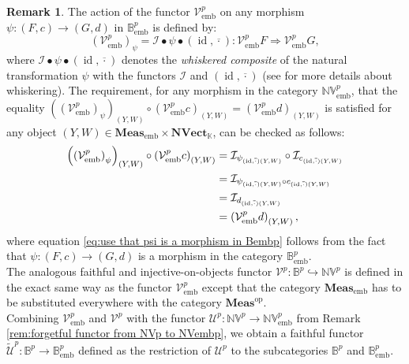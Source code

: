 \documentclass{amsart}
\theoremstyle{definition}
\newtheorem{remark}[definition]{Remark}
\theoremstyle{plain}
\newcommand{\id}{\operatorname{id}}
\newcommand{\opMeas}{\mathbf{Meas}^\mathrm{op}}
\newcommand{\embMeas}{\mathbf{Meas}_\mathrm{emb}}
\newcommand{\NVect}{\mathbf{NVect}_{\mathbb{K}}}
\newcommand{\NVembp}{\mathbb{NV}_{\mathrm{emb}}^p}
\newcommand{\NVp}{\mathbb{NV}^p}
\newcommand{\Bembp}{\mathbb{B}_{\mathrm{emb}}^p}
\newcommand{\Bp}{\mathbb{B}^p}
\begin{document}
\begin{remark}
            The action of the functor $\mathcal{V}_{\mathrm{emb}}^p$ on any morphism $\psi \colon (F,c) \rightarrow (G,d)$ in $\Bembp$ is defined by: 
            \begin{equation*}
                \left( \mathcal{V}_{\mathrm{emb}}^p \right)_{\psi} = \mathcal{I} \bullet \psi \bullet (\id,\overline{\cdot}) \colon \mathcal{V}_{\mathrm{emb}}^pF \Rightarrow \mathcal{V}_{\mathrm{emb}}^pG,
            \end{equation*}
            where $\mathcal{I} \bullet \psi \bullet (\id,\overline{\cdot})$ denotes the \emph{whiskered composite} of the natural transformation $\psi$ with the functors $\mathcal{I}$ and $(\id,\overline{\cdot})$ (see \cite[\S 1.7]{Riehl2016} for more details about whiskering).
            The requirement, for any morphism in the category $\NVembp$, that the equality $\left( \left( \mathcal{V}_{\mathrm{emb}}^p \right)_{\psi} \right)_{(Y,W)} \circ \left( \mathcal{V}_{\mathrm{emb}}^pc \right)_{(Y,W)} = \left( \mathcal{V}_{\mathrm{emb}}^pd \right)_{(Y,W)}$ is satisfied for any object $(Y,W) \in \embMeas \times \NVect$, can be checked as follows:
            \begin{align}
                \left( \left( \mathcal{V}_{\mathrm{emb}}^p \right)_{\psi} \right)_{(Y,W)} \circ \left( \mathcal{V}_{\mathrm{emb}}^pc \right)_{(Y,W)} &= \mathcal{I}_{\psi_{(\id,\overline{\cdot})(Y,W)}} \circ \mathcal{I}_{c_{(\id,\overline{\cdot})(Y,W)}} \notag \\
                &= \mathcal{I}_{\psi_{(\id,\overline{\cdot})(Y,W)} \circ c_{(\id,\overline{\cdot})(Y,W)}} \notag \\
                &= \mathcal{I}_{d_{(\id,\overline{\cdot})(Y,W)}} \label{eq:use that psi is a morphism in Bembp} \\
                &= \left( \mathcal{V}_{\mathrm{emb}}^pd \right)_{(Y,W)}, \notag
            \end{align}
            where equation \eqref{eq:use that psi is a morphism in Bembp} follows from the fact that $\psi \colon (F,c) \rightarrow (G,d)$ is a morphism in the category $\Bembp$. \\ 
            The analogous faithful and injective-on-objects functor $\mathcal{V}^p \colon \Bp \hookrightarrow \NVp$ is defined in the exact same way as the functor $\mathcal{V}_{\mathrm{emb}}^p$ except that the category $\embMeas$ has to be substituted everywhere with the category $\opMeas$. \\ 
            Combining $\mathcal{V}_{\mathrm{emb}}^p$ and $\mathcal{V}^p$ with the functor $\mathcal{U}^p \colon \NVp \rightarrow \NVembp$ from Remark \ref{rem:forgetful functor from NVp to NVembp}, we obtain a faithful functor $\tilde{\mathcal{U}}^p \colon \Bp \rightarrow \Bembp$ defined as the restriction of $\mathcal{U}^p$ to the subcategories $\Bp$ and $\Bembp$.

\end{remark}
\end{document}
